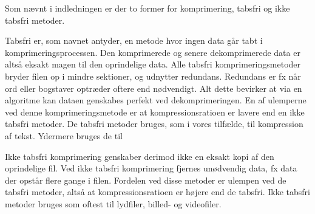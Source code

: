Som nævnt i indledningen er der to former for komprimering, tabsfri og ikke tabsfri metoder. 

Tabsfri er, som navnet antyder, en metode hvor ingen data går tabt i komprimeringsprocessen. Den komprimerede og senere dekomprimerede data er altså eksakt magen til den oprindelige data. Alle tabsfri komprimeringsmetoder bryder filen op i mindre sektioner, og udnytter redundans. Redundans er fx når ord eller bogstaver optræder oftere end nødvendigt. Alt dette bevirker at via en algoritme kan dataen genskabes perfekt ved dekomprimeringen. En af ulemperne ved denne komprimeringsmetode er at kompressionsratioen er lavere end en ikke tabsfri metoder\cite{wisegeek}. De tabsfri metoder bruges, som i vores tilfælde, til kompression af tekst. Ydermere bruges de til

Ikke tabsfri komprimering genskaber derimod ikke en eksakt kopi af den oprindelige fil. Ved ikke tabsfri komprimering fjernes unødvendig data, fx data der opstår flere gange i filen. Fordelen ved disse metoder er ulempen ved de tabsfri metoder, altså at kompressionsratioen er højere end de tabsfri. Ikke tabsfri metoder bruges som oftest til lydfiler, billed- og videofiler\cite{maximum}.
